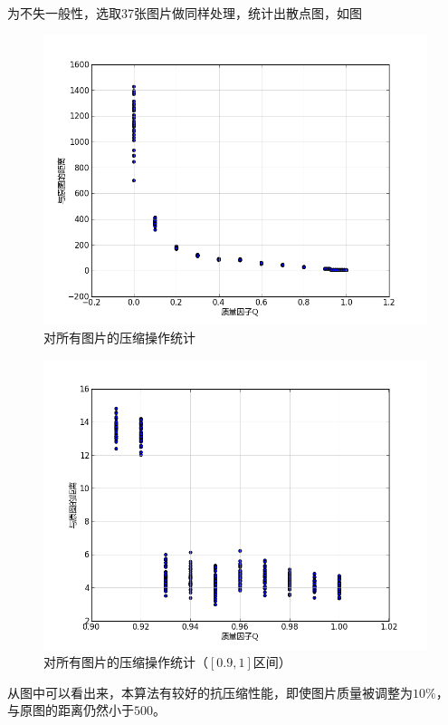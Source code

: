 为不失一般性，选取37张图片做同样处理，统计出散点图，如图
\begin{figure}[H]
  \centering
  \includegraphics[keepaspectratio=true,
  scale=0.6]{images/quality_all.png}
  \caption{对所有图片的压缩操作统计}
  \label{fig:quality-all-scatter-plot}
\end{figure}

\begin{figure}[H]
  \centering
  \includegraphics[keepaspectratio=true,
  scale=0.6]{images/quality_all_0.9_1.png}
  \caption{对所有图片的压缩操作统计（$[0.9, 1]$区间）}
  \label{fig:quality-gs0-sub-scatter-plot}
\end{figure}

从图中可以看出来，本算法有较好的抗压缩性能，即使图片质量被调整为$10\%$，
与原图的距离仍然小于$500$。


